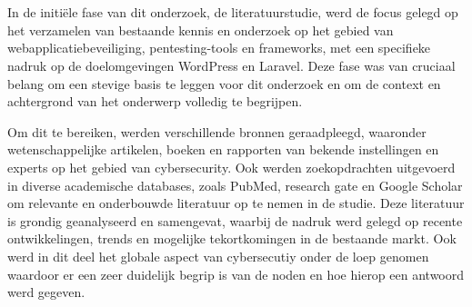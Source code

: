 
\chapter{}%
\label{ch:methodologie}


In de initiële fase van dit onderzoek, de literatuurstudie, werd de focus gelegd op het verzamelen van bestaande kennis 
en onderzoek op het gebied van webapplicatiebeveiliging, pentesting-tools en frameworks, met een specifieke nadruk op 
de doelomgevingen WordPress en Laravel. Deze fase was van cruciaal 
belang om een stevige basis te leggen voor dit onderzoek en om de context en achtergrond van het onderwerp volledig te 
begrijpen.

Om dit te bereiken, werden verschillende bronnen geraadpleegd, waaronder wetenschappelijke artikelen, boeken  
en rapporten van bekende instellingen en experts op het gebied van cybersecurity. 
Ook werden zoekopdrachten uitgevoerd in diverse academische databases, zoals PubMed, research gate en 
Google Scholar om relevante en onderbouwde literatuur op te nemen in de studie. Deze literatuur is grondig geanalyseerd en 
samengevat, waarbij de nadruk werd gelegd op recente ontwikkelingen, trends en mogelijke tekortkomingen in de bestaande markt.
Ook werd in dit deel het globale aspect van cybersecutiy onder de loep genomen waardoor er een zeer duidelijk begrip 
is van de noden en hoe hierop een antwoord werd gegeven.

